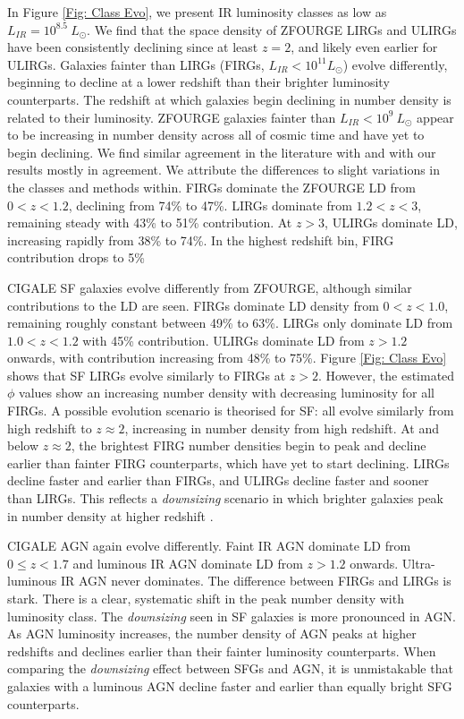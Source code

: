 In Figure \ref{Fig: Class Evo}, we present IR luminosity classes as low as $L_{IR}=10^{8.5}\ L_{\odot}$. We find that the space density of ZFOURGE LIRGs and ULIRGs have been consistently declining since at least $z=2$, and likely even earlier for ULIRGs. Galaxies fainter than LIRGs (FIRGs, $L_{IR} < 10^{11} L_{\odot}$) evolve differently, beginning to decline at a lower redshift than their brighter luminosity counterparts. The redshift at which galaxies begin declining in number density is related to their luminosity. ZFOURGE galaxies fainter than $L_{IR} < 10^{9}\ L_{\odot}$ appear to be increasing in number density across all of cosmic time and have yet to begin declining. We find similar agreement in the literature with \cite{rodighiero_mid-_2010} and \cite{gruppioni_herschel_2013} with our results mostly in agreement. We attribute the differences to slight variations in the classes and methods within. FIRGs dominate the ZFOURGE LD from $0<z<1.2$, declining from 74\% to 47\%. LIRGs dominate from $1.2<z<3$, remaining steady with 43\% to 51\% contribution. At $z>3$, ULIRGs dominate LD, increasing rapidly from 38\% to 74\%. In the highest redshift bin, FIRG contribution drops to 5\%

CIGALE SF galaxies evolve differently from ZFOURGE, although similar contributions to the LD are seen. FIRGs dominate LD density from $0<z<1.0$, remaining roughly constant between 49\% to 63\%. LIRGs only dominate LD from $1.0<z<1.2$ with 45\% contribution. ULIRGs dominate LD from $z>1.2$ onwards, with contribution increasing from 48\% to 75\%. Figure \ref{Fig: Class Evo} shows that SF LIRGs evolve similarly to FIRGs at $z>2$. However, the estimated $\phi$ values show an increasing number density with decreasing luminosity for all FIRGs. A possible evolution scenario is theorised for SF: all evolve similarly from high redshift to $z \approx 2$, increasing in number density from high redshift. At and below $z \approx 2$, the brightest FIRG number densities begin to peak and decline earlier than fainter FIRG counterparts, which have yet to start declining. LIRGs decline faster and earlier than FIRGs, and ULIRGs decline faster and sooner than LIRGs. This reflects a \textit{downsizing} scenario in which brighter galaxies peak in number density at higher redshift \citep{merloni_synthesis_2008, wylezalek_galaxy_2014, fiore_agn_2017}.

CIGALE AGN again evolve differently. Faint IR AGN dominate LD from $0 \leq z < 1.7$ and luminous IR AGN dominate LD from $z>1.2$ onwards. Ultra-luminous IR AGN never dominates. The difference between FIRGs and LIRGs is stark. There is a clear, systematic shift in the peak number density with luminosity class. The \textit{downsizing} seen in SF galaxies is more pronounced in AGN. As AGN luminosity increases, the number density of AGN peaks at higher redshifts and declines earlier than their fainter luminosity counterparts. When comparing the \textit{downsizing} effect between SFGs and AGN, it is unmistakable that galaxies with a luminous AGN decline faster and earlier than equally bright SFG counterparts.